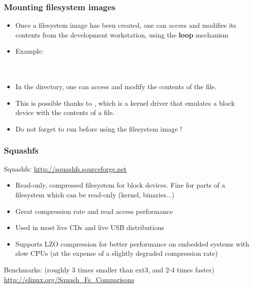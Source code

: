 \begin{frame}
  \frametitle{Mounting filesystem images}
  \begin{itemize}
  \item Once a filesystem image has been created, one can access and
    modifies its contents from the development workstation, using the
    {\bf loop} mechanism
  \item Example:\\
    \\
    \\
  \item In the  directory, one can access and modify
    the contents of the  file.
  \item This is possible thanks to , which is a kernel
    driver that emulates a block device with the contents of a file.
  \item Do not forget to run  before using the filesystem
    image !
  \end{itemize}
\end{frame}

\begin{frame}
  \frametitle{Squashfs}
  Squashfs: \url{http://squashfs.sourceforge.net}
  \begin{itemize}
  \item Read-only, compressed filesystem for block devices. Fine for
    parts of a filesystem which can be read-only (kernel, binaries...)
  \item Great compression rate and read access performance
  \item Used in most live CDs and live USB distributions
  \item Supports LZO compression for better performance on embedded
    systems with slow CPUs (at the expense of a slightly degraded
    compression rate)
  \end{itemize}
  Benchmarks: (roughly 3 times smaller than ext3, and 2-4 times faster)\\
  \url{http://elinux.org/Squash_Fs_Comparisons}
\end{frame}


